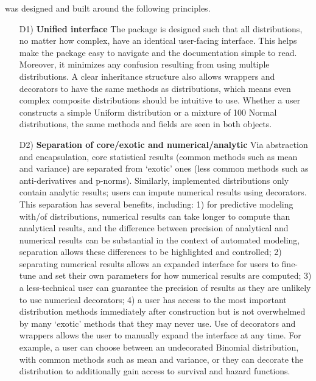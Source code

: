  was designed and built around the following principles.

\begin{itemize}
\item[D1)] \textbf{Unified interface} The package is designed such that all distributions, no matter how complex, have an identical user-facing interface. This helps make the package easy to navigate and the documentation simple to read. Moreover, it minimizes any confusion resulting from using multiple distributions. A clear inheritance structure also allows wrappers and decorators to have the same methods as distributions, which means even complex composite distributions should be intuitive to use. Whether a user constructs a simple Uniform distribution or a mixture of 100 Normal distributions, the same methods and fields are seen in both objects.

\item[D2)] \textbf{Separation of core/exotic and numerical/analytic} Via abstraction and encapsulation, core statistical results (common methods such as mean and variance) are separated from `exotic' ones (less common methods such as anti-derivatives and p-norms). Similarly, implemented distributions only contain analytic results; users can impute numerical results using decorators. This separation has several benefits, including: 1) for predictive modeling with/of distributions, numerical results can take longer to compute than analytical results, and the difference between precision of analytical and numerical results can be substantial in the context of automated modeling, separation allows these differences to be highlighted and controlled; 2) separating numerical results allows an expanded interface for users to fine-tune and set their own parameters for how numerical results are computed; 3) a less-technical user can guarantee the precision of results as they are unlikely to use numerical decorators; 4) a user has access to the most important distribution methods immediately after construction but is not overwhelmed by many `exotic' methods that they may never use. Use of decorators and wrappers allows the user to manually expand the interface at any time. For example, a user can choose between an undecorated Binomial distribution, with common methods such as mean and variance, or they can decorate the distribution to additionally gain access to survival and hazard functions.


\end{itemize}
